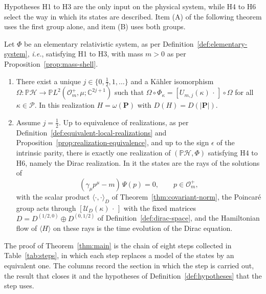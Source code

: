 Hypotheses H1 to H3 are the only input on the physical system, while H4 to H6 select the way in which its states are described. Item (A) of the following theorem uses the first group alone, and item (B) uses both groups.

\begin{theorem}\label{thm:main}
	Let $\Phi$ be an elementary relativistic system, as per Definition~\ref{def:elementary-system}, \textit{i.e.}, satisfying H1 to H3, with mass $m>0$ as per Proposition~\ref{prop:mass-shell}.
	\begin{enumerate}
		\item[\textbf{(A)}] There exist a unique $j\in\{0,\tfrac12,1,\dots\}$ and a Kähler isomorphism $\Omega:\mathbb{P}\mathcal{H}\to\mathbb{P}L^2(\mathcal{O}_m^+,\mu;\mathbb{C}^{2j+1})$ such that $\Omega\circ\Phi_\kappa=[U_{m,j}(\kappa)\,\cdot\,]\circ\Omega$ for all $\kappa\in\mathcal{P}$. In this realization $H=\omega(\mathbf{P})$ with $D(H)=D(|\mathbf{P}|)$.
		\item[\textbf{(B)}] Assume $j=\tfrac12$. Up to equivalence of realizations, as per Definition~\ref{def:equivalent-local-realizations} and Proposition~\ref{prop:realization-equivalence}, and up to the sign $\epsilon$ of the intrinsic parity, there is exactly one realization of $(\mathbb{P}\mathcal{H},\Phi)$ satisfying H4 to H6, namely the Dirac realization. In it the states are the rays of the solutions of
		\begin{equation*}
			(\gamma_\mu p^\mu-m)\,\Psi(p)=0, \qquad p\in\mathcal{O}_m^+,
		\end{equation*}
		with the scalar product $\langle\cdot,\cdot\rangle_D$ of Theorem~\ref{thm:covariant-norm}, the Poincar\'e group acts through $[\mathcal{U}_D(\kappa)\,\cdot\,]$ with the fixed matrices $D=D^{(1/2,0)}\oplus D^{(0,1/2)}$ of Definition~\ref{def:dirac-space}, and the Hamiltonian flow of $\langle H\rangle$ on these rays is the time evolution of the Dirac equation.
	\end{enumerate}
\end{theorem}

The proof of Theorem~\ref{thm:main} is the chain of eight steps collected in Table~\ref{tab:steps}, in which each step replaces a model of the states by an equivalent one. The columns record the section in which the step is carried out, the result that closes it and the hypotheses of Definition~\ref{def:hypotheses} that the step uses.

